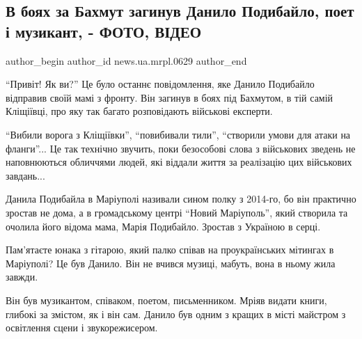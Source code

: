  
 
 
 
 
 
\subsection{В боях за Бахмут загинув Данило Подибайло, поет і музикант, - ФОТО, ВІДЕО}
\label{sec:02_06_2023.stz.news.ua.mrpl.0629.1.danylo_podybajlo}
 
\ifcmt
 author_begin
   author_id news.ua.mrpl.0629
 author_end
\fi

\begin{qqquote}
\enquote{Привіт! Як ви?} Це було останнє повідомлення, яке Данило Подибайло відправив
своїй мамі з фронту. Він загинув в боях під Бахмутом, в тій самій Кліщіївці,
про яку так багато розповідають військові експерти.
\end{qqquote}

\enquote{Вибили ворога з Кліщіївки}, \enquote{повибивали тили}, \enquote{створили умови для атаки на
фланги}... Це так технічно звучить, поки безособові слова з військових зведень не
наповнюються обличчями людей, які віддали життя за реалізацію цих військових
завдань...


Данила Подибайла  в Маріуполі називали сином полку з 2014-го, бо він практично
зростав не дома, а в громадському центрі \enquote{Новий Маріуполь}, який створила та
очолила його відома мама, Марія Подибайло. Зростав з Україною в серці.

Пам'ятаєте юнака з гітарою, який палко співав на проукраїнських мітингах в
Маріуполі? Це був Данило. Він не вчився музиці, мабуть, вона в ньому жила
завжди.

Він був музикантом, співаком, поетом, письменником. Мріяв видати книги, глибокі
за змістом, як і він сам. Данило був одним з кращих в місті майстром з
освітлення сцени і звукорежисером.

